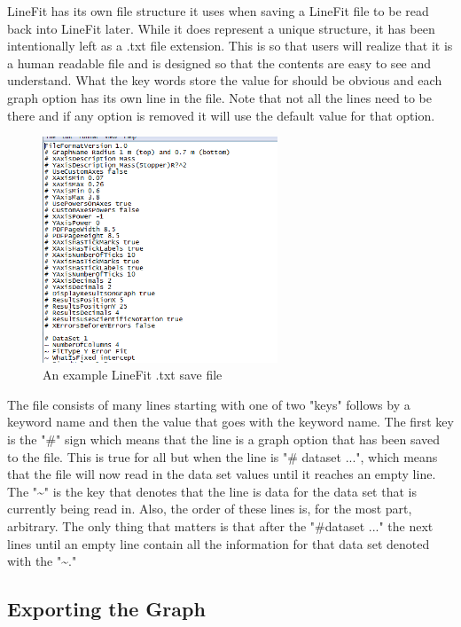 \documentclass[titlepage,12pt]{article}
\begin{document}
LineFit has its own file structure it uses when saving a LineFit file to be read back into LineFit later. While it does represent a unique structure, it has been intentionally left as a .txt file extension. This is so that users will realize that it is a human readable file and is designed so that the contents are easy to see and understand. What the key words store the value for should be obvious and each graph option has its own line in the file. Note that not all the lines need to be there and if any option is removed it will use the default value for that option.

\begin{figure}[ht!]
\centering
\includegraphics[width=7cm]{images/saveFile.png}
\caption{An example LineFit .txt save file}
\end{figure}

The file consists of many lines starting with one of two "keys" follows by a keyword name and then the value that goes with the keyword name. The first key is the "\#" sign which means that the line is a graph option that has been saved to the file. This is true for all but when the line is "\# dataset ...", which means that the file will now read in the data set values until it reaches an empty line. The "\~{}" is the key that denotes that the line is data for the data set that is currently being read in. Also, the order of these lines is, for the most part, arbitrary. The only thing that matters is that after the "\#dataset ..." the next lines until an empty line contain all the information for that data set denoted with the "\~{}."



\subsection{Exporting the Graph}
\end{document}
